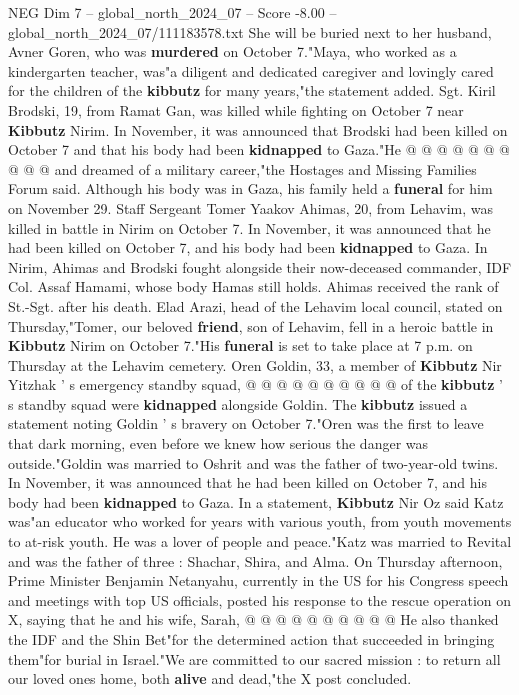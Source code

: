 \begin{textsample}{NEG Dim 7 – global\_north\_2024\_07 – Score -8.00 – global\_north\_2024\_07/111183578.txt}
She will be buried next to her husband, Avner Goren, who was \textbf{murdered} on October 7."Maya, who worked as a kindergarten teacher, was"a diligent and dedicated caregiver and lovingly cared for the children of the \textbf{kibbutz} for many years,"the statement added.
Sgt.
Kiril Brodski, 19, from Ramat Gan, was killed while fighting on October 7 near \textbf{Kibbutz} Nirim.
In November, it was announced that Brodski had been killed on October 7 and that his body had been \textbf{kidnapped} to Gaza."He @ @ @ @ @ @ @ @ @ @ and dreamed of a military career,"the Hostages and Missing Families Forum said.
Although his body was in Gaza, his family held a \textbf{funeral} for him on November 29.
Staff Sergeant Tomer Yaakov Ahimas, 20, from Lehavim, was killed in battle in Nirim on October 7.
In November, it was announced that he had been killed on October 7, and his body had been \textbf{kidnapped} to Gaza.
In Nirim, Ahimas and Brodski fought alongside their now-deceased commander, IDF Col.
Assaf Hamami, whose body Hamas still holds.
Ahimas received the rank of St.-Sgt. after his death.
Elad Arazi, head of the Lehavim local council, stated on Thursday,"Tomer, our beloved \textbf{friend}, son of Lehavim, fell in a heroic battle in \textbf{Kibbutz} Nirim on October 7."His \textbf{funeral} is set to take place at 7 p.m. on Thursday at the Lehavim cemetery.
Oren Goldin, 33, a member of \textbf{Kibbutz} Nir Yitzhak ' s emergency standby squad, @ @ @ @ @ @ @ @ @ @ of the \textbf{kibbutz} ' s standby squad were \textbf{kidnapped} alongside Goldin.
The \textbf{kibbutz} issued a statement noting Goldin ' s bravery on October 7."Oren was the first to leave that dark morning, even before we knew how serious the danger was outside."Goldin was married to Oshrit and was the father of two-year-old twins.
In November, it was announced that he had been killed on October 7, and his body had been \textbf{kidnapped} to Gaza.
In a statement, \textbf{Kibbutz} Nir Oz said Katz was"an educator who worked for years with various youth, from youth movements to at-risk youth.
He was a lover of people and peace."Katz was married to Revital and was the father of three : Shachar, Shira, and Alma.
On Thursday afternoon, Prime Minister Benjamin Netanyahu, currently in the US for his Congress speech and meetings with top US officials, posted his response to the rescue operation on X, saying that he and his wife, Sarah, @ @ @ @ @ @ @ @ @ @ He also thanked the IDF and the Shin Bet"for the determined action that succeeded in bringing them"for burial in Israel."We are committed to our sacred mission : to return all our loved ones home, both \textbf{alive} and dead,"the X post concluded.

\end{textsample}
